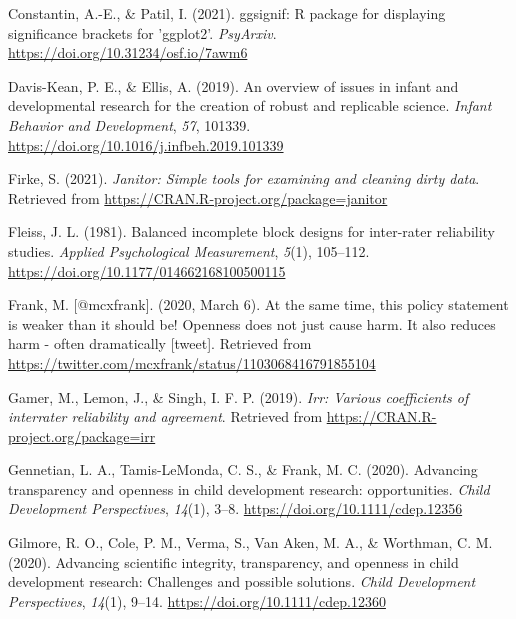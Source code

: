 \documentclass[
  english,
  man,floatsintext]{apa6}
\newlength{\cslhangindent}
\newlength{\cslentryspacingunit} %
\newenvironment{CSLReferences}[2] %
 {%
  \setlength{\parindent}{0pt}
  \ifodd #1
  \let\oldpar\par
  \def\par{\hangindent=\cslhangindent\oldpar}
  \fi
  \setlength{\parskip}{#2\cslentryspacingunit}
 }%
 {}
\begin{document}
\begin{CSLReferences}{1}{0}
\leavevmode{}%
Constantin, A.-E., \& Patil, I. (2021). {ggsignif}: R package for displaying significance brackets for {'ggplot2'}. \emph{PsyArxiv}. \url{https://doi.org/10.31234/osf.io/7awm6}

\leavevmode{}%
Davis-Kean, P. E., \& Ellis, A. (2019). An overview of issues in infant and developmental research for the creation of robust and replicable science. \emph{Infant Behavior and Development}, \emph{57}, 101339. \url{https://doi.org/10.1016/j.infbeh.2019.101339}

\leavevmode{}%
Firke, S. (2021). \emph{Janitor: Simple tools for examining and cleaning dirty data}. Retrieved from \url{https://CRAN.R-project.org/package=janitor}

\leavevmode{}%
Fleiss, J. L. (1981). Balanced incomplete block designs for inter-rater reliability studies. \emph{Applied Psychological Measurement}, \emph{5}(1), 105--112. \url{https://doi.org/10.1177/014662168100500115}

\leavevmode{}%
Frank, M. {[}@mcxfrank{]}. (2020, March 6). At the same time, this policy statement is weaker than it should be! Openness does not just cause harm. It also reduces harm - often dramatically {[}tweet{]}. Retrieved from \url{https://twitter.com/mcxfrank/status/1103068416791855104}

\leavevmode{}%
Gamer, M., Lemon, J., \& Singh, I. F. P. (2019). \emph{Irr: Various coefficients of interrater reliability and agreement}. Retrieved from \url{https://CRAN.R-project.org/package=irr}

\leavevmode{}%
Gennetian, L. A., Tamis-LeMonda, C. S., \& Frank, M. C. (2020). Advancing transparency and openness in child development research: opportunities. \emph{Child Development Perspectives}, \emph{14}(1), 3--8. \url{https://doi.org/10.1111/cdep.12356}

\leavevmode{}%
Gilmore, R. O., Cole, P. M., Verma, S., Van Aken, M. A., \& Worthman, C. M. (2020). Advancing scientific integrity, transparency, and openness in child development research: Challenges and possible solutions. \emph{Child Development Perspectives}, \emph{14}(1), 9--14. \url{https://doi.org/10.1111/cdep.12360}


\end{CSLReferences}
\end{document}
